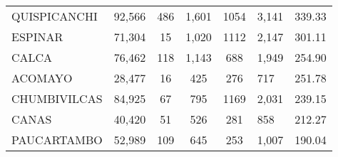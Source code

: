 \begin{tabular}{lrccclr}
	\cellcolor[HTML]{FFE699}QUISPICANCHI                           & 92,566                                                         & 486                                                         & 1,601                & 1054                     & 3,141                                                               & 339.33                                                                       \\
	\cellcolor[HTML]{FFE699}ESPINAR                                & 71,304                                                         & 15                                                          & 1,020                & 1112                     & 2,147                                                               & 301.11                                                                       \\
	\cellcolor[HTML]{FFE699}CALCA                                  & 76,462                                                         & 118                                                         & 1,143                & 688                      & 1,949                                                               & 254.90                                                                       \\
	\cellcolor[HTML]{FFE699}ACOMAYO                                & 28,477                                                         & 16                                                          & 425                  & 276                      & 717                                                                 & 251.78                                                                       \\
	\cellcolor[HTML]{FFE699}CHUMBIVILCAS                           & 84,925                                                         & 67                                                          & 795                  & 1169                     & 2,031                                                               & 239.15                                                                       \\
	\cellcolor[HTML]{C6E0B4}CANAS                                  & 40,420                                                         & 51                                                          & 526                  & 281                      & 858                                                                 & 212.27                                                                       \\
	\cellcolor[HTML]{C6E0B4}PAUCARTAMBO                            & 52,989                                                         & 109                                                         & 645                  & 253                      & 1,007                                                               & 190.04                                                                       \\

\end{tabular}
